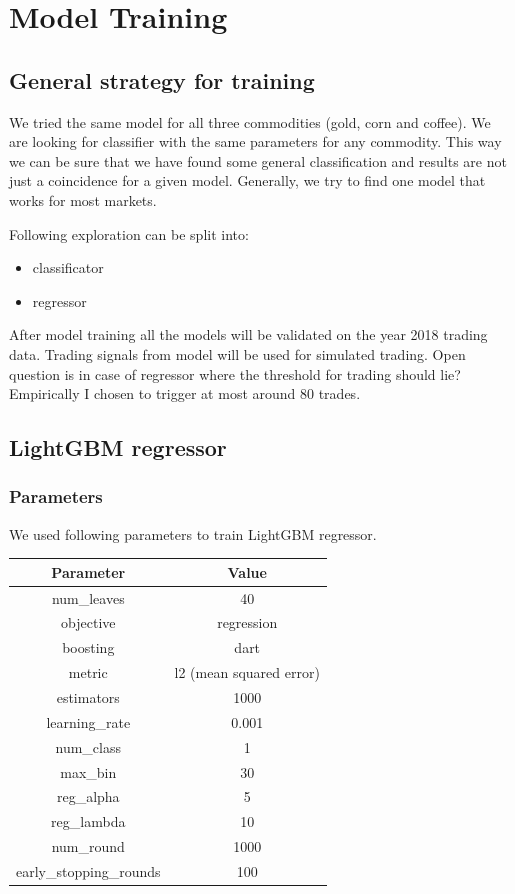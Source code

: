 \documentclass[final,2p]{elsarticle}
\begin{document}
\clearpage

\section{Model Training}
\subsection{General strategy for training}
We tried the same model for all three commodities (gold, corn and coffee). We are looking for classifier with the same parameters for any commodity. This way we can be sure that we have found some general classification and results are not just a coincidence for a given model.
Generally, we try to find one model that works for most markets.

Following exploration can be split into:

\begin{itemize}
    \item classificator
    \item regressor
\end{itemize}

After model training all the models will be validated on the year 2018 trading data. Trading signals from model will be used for simulated trading. Open question is in case of regressor where the threshold for trading should lie?
Empirically I chosen to trigger at most around $80$ trades.

\subsection{LightGBM regressor}

\subsubsection{Parameters}
We used following parameters to train LightGBM regressor. 

\begin{center}
\begin{tabular}{cc}
    Parameter & Value \\
    \hline
    num\_leaves & 40 \\
    objective & regression \\
    boosting & dart \\
    metric & l2 (mean squared error) \\
    estimators & 1000 \\
    learning\_rate & 0.001 \\
    num\_class & 1 \\
    max\_bin & 30 \\
    reg\_alpha & 5 \\
    reg\_lambda & 10 \\
    num\_round & 1000 \\
    early\_stopping\_rounds & 100 \\
\end{tabular}
\end{center}
\end{document}
